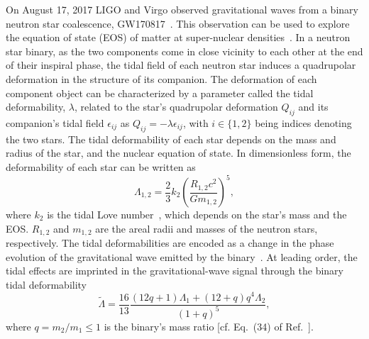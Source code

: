On August 17, 2017 LIGO and Virgo observed gravitational waves from a binary neutron star coalescence, GW170817~\cite{TheLIGOScientific:2017qsa}.
This observation can be used to explore the equation of state (EOS) of matter at super-nuclear densities~\cite{thorne.k:1987,Read:2009yp}. In a neutron star binary, as the two components come in close vicinity to each other at the end of their inspiral phase, the tidal field of each neutron star induces a quadrupolar deformation in the structure of its companion. The deformation of each component object can be characterized by a parameter called the tidal deformability, $\lambda$, related to the star's quadrupolar deformation $Q_{ij}$ and its companion's tidal field $\epsilon_{ij}$ as $Q_{ij} = -\lambda \epsilon_{ij}$, with $i \in \{1,2\}$ being indices denoting the two stars. The tidal deformability of each star depends on the mass and radius of the star, and the nuclear equation of state. In dimensionless form, the deformability of each star can be written as
\begin{equation}
\Lambda_{1,2}=\frac{2}{3}k_2\left(\frac{R_{1,2}c^2}{Gm_{1,2}}\right)^5, \label{eq:lambda_12}
\end{equation}
where $k_2$ is the tidal Love number~\cite{Flanagan:2007ix,Hinderer:2007mb}, which depends on the star's mass and the EOS. $R_{1,2}$ and $m_{1,2}$ are the areal radii and masses of the neutron stars, respectively. The tidal deformabilities are encoded as a change in the phase evolution of the gravitational wave emitted by the binary~\cite{Flanagan:2007ix}. %
At leading order, the tidal effects are imprinted in the gravitational-wave signal through the binary tidal deformability~\cite{Flanagan:2007ix,Hinderer:2007mb}
\begin{equation}
\tilde{\Lambda}
= \frac{16}{13}\frac{(12q+1)\Lambda_1+(12+q)q^4\Lambda_2}{(1+q)^5}, \label{eq:lambda_t0}
\end{equation}
where $q = m_2/m_1 \leq 1$ is the binary's mass ratio [cf. Eq.~(34) of Ref.~\cite{Gralla:2017djj}]. %


